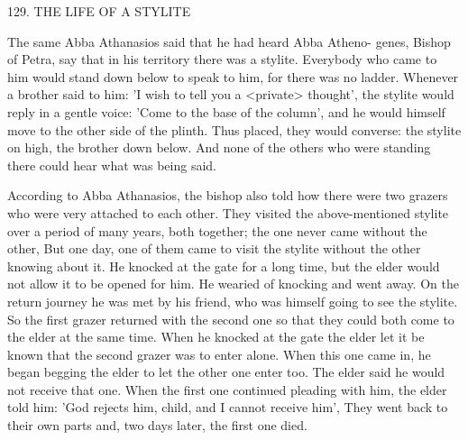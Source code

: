 129. THE LIFE OF A STYLITE

The same Abba Athanasios said that he had heard Abba Atheno-
genes, Bishop of Petra, say that in his territory there was a stylite.
Everybody who came to him would stand down below to speak to
him, for there was no ladder. Whenever a brother said to him: 'I
wish to tell you a <private> thought', the stylite would reply in a
gentle voice: 'Come to the base of the column', and he would
himself move to the other side of the plinth. Thus placed, they
would converse: the stylite on high, the brother down below. And
none of the others who were standing there could hear what was
being said.

According to Abba Athanasios, the bishop also told how there
were two grazers who were very attached to each other. They visited
the above-mentioned stylite over a period of many years, both
together; the one never came without the other, But one day, one of
them came to visit the stylite without the other knowing about it.
He knocked at the gate for a long time, but the elder would not
allow it to be opened for him. He wearied of knocking and went
away. On the return journey he was met by his friend, who was
himself going to see the stylite. So the first grazer returned with the
second one so that they could both come to the elder at the same
time. When he knocked at the gate the elder let it be known that the
second grazer was to enter alone. When this one came in, he began
begging the elder to let the other one enter too. The elder said he
would not receive that one. When the first one continued pleading
with him, the elder told him: 'God rejects him, child, and I cannot
receive him', They went back to their own parts and, two days later,
the first one died.

